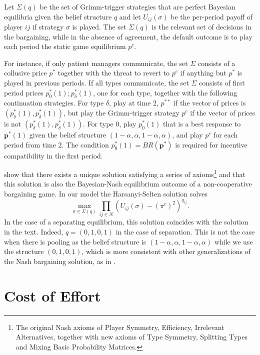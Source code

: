 \documentclass[]{article}
\newcommand{\p}{\mathbf p}
\begin{document}
Let $\Sigma(q)$ be the set of Grimm-trigger strategies that are perfect Bayesian equilibria given the belief structure $q$ and let $U_{ij}(\sigma)$ be the per-period payoff of player $ij$ if strategy $\sigma$ is played. The set $\Sigma(q)$ is the relevant set of decisions in the bargaining, while in the absence of agreement, the default outcome is to play each period the static game equilibrium $p^c$.

For instance, if only patient managers communicate, the set $\Sigma$ consists of a collusive price $p^*$ together with the threat to revert to $p^c$ if anything but $p^*$ is played in previous periods. If all types communicate, the set $\Sigma$ consists of first period prices $p^*_0(1);p^*_\delta(1)$, one for each type, together with the following continuation strategies. For type $\delta$, play at time $2$, $p^{**}$ if the vector of prices is $(p^*_\delta(1),p^*_\delta(1))$, but play the Grimm-trigger strategy $p^{c}$ if the vector of prices is not $(p^*_\delta(1),p^*_\delta(1))$. For type $0$, play $p^*_0(1)$ that is a best response to $\p^*(1)$ given the belief structure $(1-\alpha,\alpha,1-\alpha,\alpha)$, and play $p^c$ for each period from  time $2$. The condition $p^*_0(1)=BR(\p^*)$ is required for incentive compatibility in the first period.

\cite{Harsanyi1972} show that there exists a unique solution satisfying a series of axioms\footnote{%
The original Nash axioms of Player Symmetry, Efficiency, Irrelevant Alternatives, together with new axioms of Type Symmetry, Splitting Types and Mixing Basic Probability Matrices.
} and that this solution is also the Bayesian-Nash equilibrium outcome of a non-cooperative bargaining game. In our model the Harsanyi-Selten solution solves
\[
\max_{\sigma\in\Sigma(q)}\prod_{ij\in N} (U_{ij}(\sigma)-(\pi^c)^2)^{q_{ij}}.
\]
In the case of a separating equilibrium, this solution coincides with the solution in the text. Indeed, $q=(0,1,0,1)$ in the case of separation. This is not the case when there is pooling as the belief structure is $(1-\alpha,\alpha,1-\alpha,\alpha)$ while we use the structure $(0,1,0,1)$, which is more consistent with other generalizations of the Nash bargaining solution, as in \cite{Myerson1984,Weidner1992}.



\section{Cost of Effort} %
\label{sec:cost_of_effort}
\end{document}
